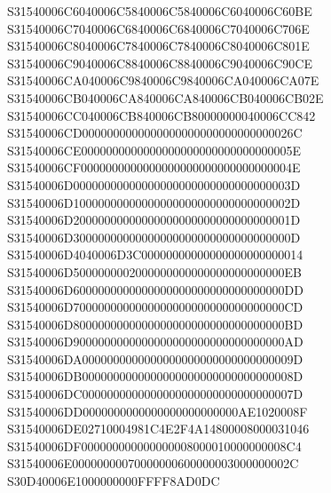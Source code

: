 \documentclass[12pt,a4paper]{article}
\begin{document}
\begin{framed}
{S31540006C6040006C5840006C5840006C6040006C60BE\newline
S31540006C7040006C6840006C6840006C7040006C706E\newline
S31540006C8040006C7840006C7840006C8040006C801E\newline
S31540006C9040006C8840006C8840006C9040006C90CE\newline
S31540006CA040006C9840006C9840006CA040006CA07E\newline
S31540006CB040006CA840006CA840006CB040006CB02E\newline
S31540006CC040006CB840006CB80000000040006CC842\newline
S31540006CD0000000000000000000000000000000026C\newline
S31540006CE0000000000000000000000000000000005E\newline
S31540006CF0000000000000000000000000000000004E\newline
S31540006D00000000000000000000000000000000003D\newline
S31540006D10000000000000000000000000000000002D\newline
S31540006D20000000000000000000000000000000001D\newline
S31540006D30000000000000000000000000000000000D\newline
S31540006D4040006D3C00000000000000000000000014\newline
S31540006D5000000002000000000000000000000000EB\newline
S31540006D6000000000000000000000000000000000DD\newline
S31540006D7000000000000000000000000000000000CD\newline
S31540006D8000000000000000000000000000000000BD\newline
S31540006D9000000000000000000000000000000000AD\newline
S31540006DA0000000000000000000000000000000009D\newline
S31540006DB0000000000000000000000000000000008D\newline
S31540006DC0000000000000000000000000000000007D\newline
S31540006DD0000000000000000000000000AE1020008F\newline
S31540006DE02710004981C4E2F4A14800008000031046\newline
S31540006DF000000000000000008000010000000008C4\newline
S31540006E00000000070000000600000003000000002C\newline
S30D40006E1000000000FFFF8AD0DC\newline
}
\end{framed}
\end{document}
